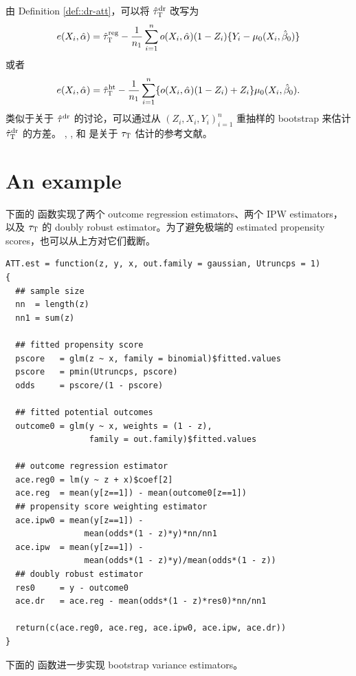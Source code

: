 由 Definition \ref{def::dr-att}，可以将 $\hat{\tau}_\textsc{T}^\textup{dr}$ 改写为
$$
e(X_i, \hat{\alpha})
= \hat{\tau}_\textsc{T}^\textup{reg}
 - \frac{1}{n_1} \sum_{i=1}^n  o(X_i,\hat{\alpha})  (1-Z_i)\{ Y_i-\mu_0(X_i, \hat{\beta}_0) \}    
$$
或者
$$
e(X_i, \hat{\alpha})
= \hat{\tau}_\textsc{T}^\textup{ht} 
- \frac{1}{n_1} \sum_{i=1}^n  \{ o(X_i,\hat{\alpha}) (1-Z_i) + Z_i  \} \mu_0(X_i, \hat{\beta}_0)  .
$$
类似于关于 $\hat{\tau}^\textup{dr}  $ 的讨论，可以通过从 $(Z_i, X_i, Y_i)_{i=1}^n$ 重抽样的 bootstrap 来估计 $\hat{\tau}_\textsc{T}^\textup{dr}  $ 的方差。
\citet{hahn1998role}, \citet{mercatanti2014debit}, \citet{shinozaki2015brief} 和 \citet{yang2018asymptotic} 是关于 $\tau_\textsc{T}$ 估计的参考文献。



\section{An example}
\label{sec::dr-att-example}


下面的  函数实现了两个 outcome regression estimators、两个 IPW estimators，以及 $\tau_\textsc{T}$ 的 doubly robust estimator。为了避免极端的 estimated propensity scores，也可以从上方对它们截断。

\begin{lstlisting}
ATT.est = function(z, y, x, out.family = gaussian, Utruncps = 1)
{
  ## sample size
  nn  = length(z)
  nn1 = sum(z)
  
  ## fitted propensity score
  pscore   = glm(z ~ x, family = binomial)$fitted.values
  pscore   = pmin(Utruncps, pscore)
  odds     = pscore/(1 - pscore)
  
  ## fitted potential outcomes
  outcome0 = glm(y ~ x, weights = (1 - z), 
                 family = out.family)$fitted.values
  
  ## outcome regression estimator
  ace.reg0 = lm(y ~ z + x)$coef[2]
  ace.reg  = mean(y[z==1]) - mean(outcome0[z==1]) 
  ## propensity score weighting estimator
  ace.ipw0 = mean(y[z==1]) - 
                mean(odds*(1 - z)*y)*nn/nn1
  ace.ipw  = mean(y[z==1]) - 
                mean(odds*(1 - z)*y)/mean(odds*(1 - z))
  ## doubly robust estimator
  res0     = y - outcome0
  ace.dr   = ace.reg - mean(odds*(1 - z)*res0)*nn/nn1
  
  return(c(ace.reg0, ace.reg, ace.ipw0, ace.ipw, ace.dr))     
}
\end{lstlisting}

下面的  函数进一步实现 bootstrap variance estimators。

